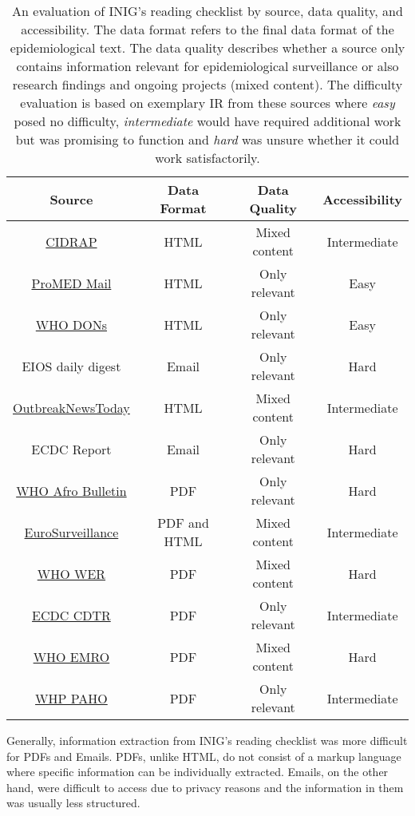   \begin{table}[h!]
    \centering
    \begin{tabular}{@{}cccc@{}}
      \toprule
      \textbf{Source} & \textbf{Data Format} & \textbf{Data Quality} & \textbf{Accessibility}\\
      \midrule
      \href{http://www.cidrap.umn.edu/}{CIDRAP} & HTML & Mixed content & Intermediate \\
      \href{http://www.promedmail.org/}{ProMED Mail} & HTML & Only relevant & Easy\\
      \href{http://www.who.int/csr/don/en/}{WHO DONs} & HTML & Only relevant & Easy \\
      EIOS daily digest & Email & Only relevant & Hard \\
      \href{http://outbreaknewstoday.com/}{OutbreakNewsToday} & HTML & Mixed content & Intermediate\\
      ECDC Report & Email & Only relevant & Hard \\
      \href{http://www.afro.who.int/fr/health-topics/disease-outbreaks/outbreaks-and-other-emergencies-updates}{WHO Afro Bulletin} & PDF & Only relevant & Hard \\
      \href{http://www.eurosurveillance.org/content/eurosurveillance/browse}{EuroSurveillance} & PDF and HTML & Mixed content & Intermediate \\
      \href{http://www.who.int/wer/en/}{WHO WER} & PDF & Mixed content & Hard\\
      \href{https://ecdc.europa.eu/en/threats-and-outbreaks/reports-and-data/weekly-threats}{ECDC CDTR} & PDF & Only relevant & Intermediate \\
      \href{http://www.emro.who.int/pandemic-epidemic-diseases/information-resources/weekly-epidemiological-monitor.html}{WHO EMRO} & PDF & Mixed content & Hard \\
      \href{https://www.paho.org/hq/index.php?option=com_content&view=article&id=14044:epidemiological-alerts-archive-by-year-2018&Itemid=72203&lang=en}{WHP PAHO} & PDF & Only relevant & Intermediate\\
      \bottomrule
    \end{tabular}
    \caption{An evaluation of INIG's reading checklist by source, data quality, and accessibility. The data format refers to the final data format of the epidemiological text. The data quality describes whether a source only contains information relevant for epidemiological surveillance or also research findings and ongoing projects (mixed content). The difficulty evaluation is based on exemplary IR from these sources where \textsl{easy} posed no difficulty, \textsl{intermediate} would have required additional work but was promising to function and \textsl{hard} was unsure whether it could work satisfactorily.}
  \label{table:INIGsources}
  \end{table}
  Generally, information extraction from INIG's reading checklist was more difficult for PDFs and Emails.
  PDFs, unlike HTML, do not consist of a markup language where specific information can be individually extracted.
  Emails, on the other hand, were difficult to access due to privacy reasons and the information in them was usually less structured.

